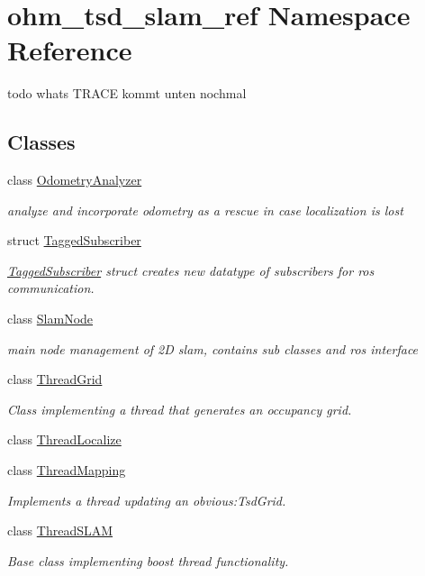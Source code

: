 \hypertarget{namespaceohm__tsd__slam__ref}{\section{ohm\-\_\-tsd\-\_\-slam\-\_\-ref Namespace Reference}
\label{namespaceohm__tsd__slam__ref}
}


todo whats T\-R\-A\-C\-E kommt unten nochmal  


\subsection*{Classes}
\begin{DoxyCompactItemize}
\item 
class \hyperlink{classohm__tsd__slam__ref_1_1OdometryAnalyzer}{Odometry\-Analyzer}
\begin{DoxyCompactList}\small\item\em analyze and incorporate odometry as a rescue in case localization is lost \end{DoxyCompactList}\item 
struct \hyperlink{structohm__tsd__slam__ref_1_1TaggedSubscriber}{Tagged\-Subscriber}
\begin{DoxyCompactList}\small\item\em \hyperlink{structohm__tsd__slam__ref_1_1TaggedSubscriber}{Tagged\-Subscriber} struct creates new datatype of subscribers for ros communication. \end{DoxyCompactList}\item 
class \hyperlink{classohm__tsd__slam__ref_1_1SlamNode}{Slam\-Node}
\begin{DoxyCompactList}\small\item\em main node management of 2\-D slam, contains sub classes and ros interface \end{DoxyCompactList}\item 
class \hyperlink{classohm__tsd__slam__ref_1_1ThreadGrid}{Thread\-Grid}
\begin{DoxyCompactList}\small\item\em Class implementing a thread that generates an occupancy grid. \end{DoxyCompactList}\item 
class \hyperlink{classohm__tsd__slam__ref_1_1ThreadLocalize}{Thread\-Localize}
\item 
class \hyperlink{classohm__tsd__slam__ref_1_1ThreadMapping}{Thread\-Mapping}
\begin{DoxyCompactList}\small\item\em Implements a thread updating an obvious\-:Tsd\-Grid. \end{DoxyCompactList}\item 
class \hyperlink{classohm__tsd__slam__ref_1_1ThreadSLAM}{Thread\-S\-L\-A\-M}
\begin{DoxyCompactList}\small\item\em Base class implementing boost thread functionality. \end{DoxyCompactList}\end{DoxyCompactItemize}


